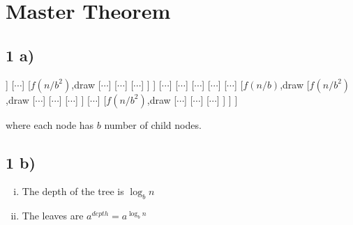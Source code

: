 \documentclass[A4paper]{article}
\begin{document}
\section{Master Theorem}
\subsection*{1 a)}
\begin{center}
\begin{forest}
[$f(n)$,draw
	[$f(n/b)$,draw
		[$f(n/b^2)$,draw
			[$\cdots$]
			[$\cdots$]
			[$\cdots$]
		]
		[$\cdots$]
		[$f(n/b^2)$,draw
			[$\cdots$]
			[$\cdots$]
			[$\cdots$]
		]
	]
	[$\cdots$]
	[$\cdots$]
	[$\cdots$]
	[$\cdots$]
	[$\cdots$]
	[$f(n/b)$,draw
		[$f(n/b^2)$,draw
			[$\cdots$]
			[$\cdots$]
			[$\cdots$]
		]
		[$\cdots$]
		[$f(n/b^2)$,draw
			[$\cdots$]
			[$\cdots$]
			[$\cdots$]
		]
	]
]
\end{forest}
\end{center}
where each node has $b$ number of child nodes.
\subsection*{1 b)}
\begin{enumerate}[i)]
\item The depth of the tree is $\log_{b}n$
\item The leaves are $\displaystyle a^{depth} = a^{\log_{b}n}$
\end{enumerate}
\end{document}
